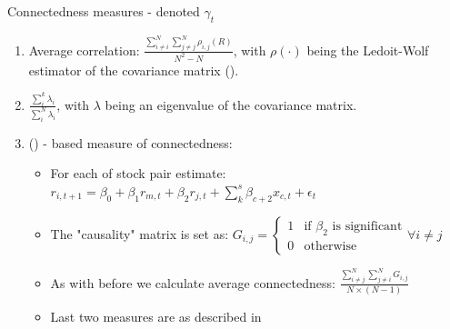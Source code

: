 \documentclass{beamer}
\begin{document}
\begin{frame}{Connectedness measures - denoted $\gamma_t$}

\begin{enumerate}
    \item<1-> Average correlation: $\frac{\sum_{i \neq i}^{N} \sum_{j \neq j}^{N} \rho_{i,j}(R)}{N^2-N}$,  with $\rho(\cdot)$ being the Ledoit-Wolf estimator of the covariance matrix (\cite{ledoit}).
    \item<2-> $\frac{\sum_{i}^{k} \lambda_i}{\sum_{i}^{N} \lambda_i}$, with $\lambda$ being an eigenvalue of the covariance matrix. 
    \item<3-> (\cite{granger}) - based measure of connectedness:
    \begin{itemize}
        \item<4-> For each of stock pair estimate: $r_{i,t+1} = \beta_0 + \beta_1 r_{m, t} + \beta_2 r_{j, t} + \sum_{k}^{s} \beta_{c+2} x_{c, t} + \epsilon_t$
        \item<5-> The "causality" matrix is set as: $G_{i,j} = \begin{cases}
            1  & \text{if } \beta_2 \text{ is significant} \\
            0 & \text{otherwise}
          \end{cases} \forall i \neq j$
        \item<6-> As with before we calculate average connectedness: $\frac{\sum_{i \neq j}^{N} \sum_{j \neq i}^{N} G_{i,j}}{ N \times (N-1)}$
        \item<7->  Last two measures are as described in \cite{billio}
    \end{itemize}
\end{enumerate}
   
\end{frame}
\end{document}
